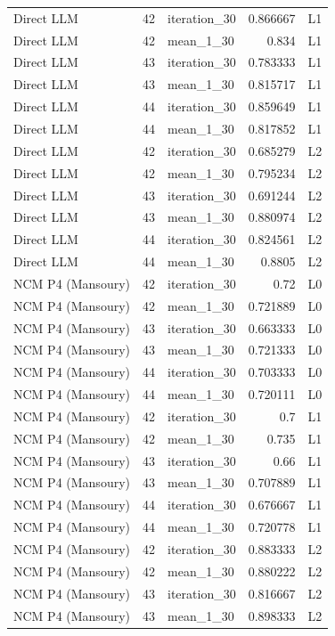 \begin{table}[htbp!]
\begin{tabular}{lrlrl}
Direct LLM & 42 & iteration\_30 & 0.866667 & L1 \\
Direct LLM & 42 & mean\_1\_30 & 0.834 & L1 \\
Direct LLM & 43 & iteration\_30 & 0.783333 & L1 \\
Direct LLM & 43 & mean\_1\_30 & 0.815717 & L1 \\
Direct LLM & 44 & iteration\_30 & 0.859649 & L1 \\
Direct LLM & 44 & mean\_1\_30 & 0.817852 & L1 \\
Direct LLM & 42 & iteration\_30 & 0.685279 & L2 \\
Direct LLM & 42 & mean\_1\_30 & 0.795234 & L2 \\
Direct LLM & 43 & iteration\_30 & 0.691244 & L2 \\
Direct LLM & 43 & mean\_1\_30 & 0.880974 & L2 \\
Direct LLM & 44 & iteration\_30 & 0.824561 & L2 \\
Direct LLM & 44 & mean\_1\_30 & 0.8805 & L2 \\
NCM P4 (Mansoury) & 42 & iteration\_30 & 0.72 & L0 \\
NCM P4 (Mansoury) & 42 & mean\_1\_30 & 0.721889 & L0 \\
NCM P4 (Mansoury) & 43 & iteration\_30 & 0.663333 & L0 \\
NCM P4 (Mansoury) & 43 & mean\_1\_30 & 0.721333 & L0 \\
NCM P4 (Mansoury) & 44 & iteration\_30 & 0.703333 & L0 \\
NCM P4 (Mansoury) & 44 & mean\_1\_30 & 0.720111 & L0 \\
NCM P4 (Mansoury) & 42 & iteration\_30 & 0.7 & L1 \\
NCM P4 (Mansoury) & 42 & mean\_1\_30 & 0.735 & L1 \\
NCM P4 (Mansoury) & 43 & iteration\_30 & 0.66 & L1 \\
NCM P4 (Mansoury) & 43 & mean\_1\_30 & 0.707889 & L1 \\
NCM P4 (Mansoury) & 44 & iteration\_30 & 0.676667 & L1 \\
NCM P4 (Mansoury) & 44 & mean\_1\_30 & 0.720778 & L1 \\
NCM P4 (Mansoury) & 42 & iteration\_30 & 0.883333 & L2 \\
NCM P4 (Mansoury) & 42 & mean\_1\_30 & 0.880222 & L2 \\
NCM P4 (Mansoury) & 43 & iteration\_30 & 0.816667 & L2 \\
NCM P4 (Mansoury) & 43 & mean\_1\_30 & 0.898333 & L2 \\

\end{tabular}
\end{table}
